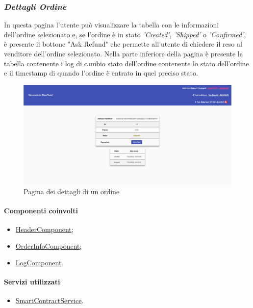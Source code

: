 \newpage

\subsubsection*{\textit{Dettagli Ordine}}
In questa pagina l'utente può visualizzare la tabella con le informazioni dell'ordine selezionato e, se l'ordine è in stato \textit{'Created', 'Shipped'} o \textit{'Confirmed'}, è presente il bottone "Ask Refund" che permette all'utente di chiedere il reso al venditore dell'ordine selezionato. Nella parte inferiore della pagina è presente la tabella contenente i log di cambio stato dell'ordine contenente lo stato dell'ordine e il timestamp di quando l'ordine è entrato in quel preciso stato.

\begin{figure}[!h] 
    \centering 
    \includegraphics[width=1\columnwidth]{immagini/maschere/orderinfo.png} 
    \caption{Pagina dei dettagli di un ordine}
\end{figure}

\paragraph{Componenti coinvolti}
\begin{itemize}
    \item \hyperref[sec:header-component]{HeaderComponent};
    \item \hyperref[sec:order-info-component]{OrderInfoComponent};
    \item \hyperref[sec:log-component]{LogComponent}.
\end{itemize}

\paragraph{Servizi utilizzati}
\begin{itemize}
    \item \hyperref[sec:smart-contract-service]{SmartContractService}.
\end{itemize}

